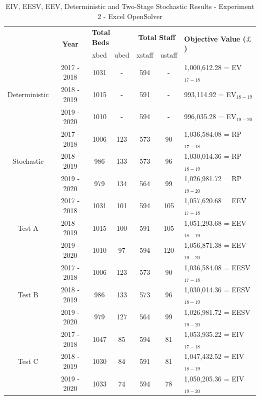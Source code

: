 \documentclass[../thesis.tex]{subfiles}
\begin{document}
\begin{table}[h!]
    \centering
    \begin{tabular}{ccccccl}\toprule
 & \multirow{2}{*}{\textbf{Year}}& \multicolumn{2}{l}{\textbf{Total Beds}} & \multicolumn{2}{c}{\textbf{Total Staff}} & \multirow{2}{*}{\textbf{Objective Value ($\pounds$)}}\\ \cmidrule(lr){3-4} \cmidrule(lr){5-6}
&& xbed           & ubed          & xstaff         & ustaff         \\ \midrule
     \multirow{3}{*}{Deterministic} & 2017 - 2018 & 1031 & - &  594 & - & 1,000,612.28 =  EV$_{17-18}$ \\ 
      & 2018 - 2019 & 1015 & - & 591 & - & 993,114.92 =  EV$_{18-19}$ \\
      & 2019 - 2020 & 1010 & - & 594 & - & 996,035.28 =  EV$_{19-20}$\\ \midrule
     \multirow{3}{*}{Stochastic} & 2017 - 2018 & 1006 & 123 & 573 & 90 & 1,036,584.08 =  RP$_{17-18}$ \\ 
      & 2018 - 2019 & 986 & 133 & 573 & 96 & 1,030,014.36 =  RP$_{18-19}$ \\
      & 2019 - 2020 & 979 & 134 & 564 & 99 & 1,026,981.72 =  RP$_{19-20}$\\ \midrule    
     \multirow{3}{*}{Test A} & 2017 - 2018 & 1031 & 101 & 594 & 105 & 1,057,620.68 =  EEV$_{17-18}$ \\ 
      & 2018 - 2019 & 1015 & 100 & 591 & 105 &  1,051,293.68 =  EEV$_{18-19}$ \\
      & 2019 - 2020 & 1010 & 97 & 594 & 120 & 1,056,871.38 =  EEV$_{19-20}$\\  \midrule    
     \multirow{3}{*}{Test B} &  2017 - 2018 & 1006 & 123 & 573 & 90 & 1,036,584.08 =    EESV$_{17-18}$ \\ 
      & 2018 - 2019 & 986 & 133 & 573 & 96 & 1,030,014.36 =   EESV$_{18-19}$ \\
      & 2019 - 2020 & 979 & 127 & 564 & 99 & 1,026,981.72 = EESV$_{19-20}$\\\midrule 
     \multirow{3}{*}{Test C} & 2017 - 2018 & 1047 & 85 & 594 & 81 & 1,053,935.22 =  EIV$_{17-18}$ \\ 
      & 2018 - 2019 & 1030 & 84 & 591 & 81 &  1,047,432.52 =  EIV$_{18-19}$ \\
      & 2019 - 2020 & 1033 & 74 & 594 & 78 & 1,050,205.36 =  EIV$_{19-20}$\\\bottomrule
    \end{tabular}
    \caption{EIV, EESV, EEV, Deterministic and Two-Stage Stochastic Results - Experiment 2 - Excel OpenSolver}
    \label{tab:eiveesveevdetstocresults2}
\end{table}
\end{document}
